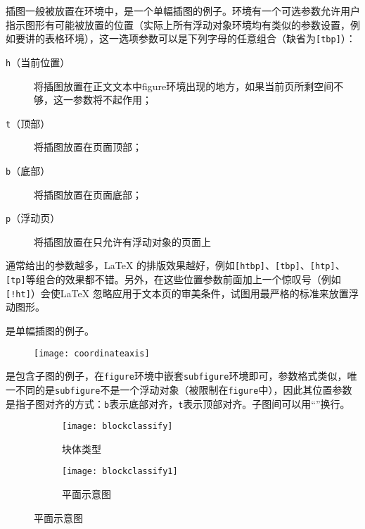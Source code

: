 插图一般被放置在环境中，是一个单幅插图的例子。环境有一个可选参数允许用户指示图形有可能被放置的位置（实际上所有浮动对象环境均有类似的参数设置，例如要讲的表格环境），这一选项参数可以是下列字母的任意组合（缺省为\texttt{[tbp]}）：
\begin{description}
	\item[\texttt{h}（当前位置）] 将插图放置在正文文本中figure环境出现的地方，如果当前页所剩空间不够，这一参数将不起作用；
	\item[\texttt{t}（顶部）] 将插图放置在页面顶部；
	\item[\texttt{b}（底部）] 将插图放置在页面底部；
	\item[\texttt{p}（浮动页）] 将插图放置在只允许有浮动对象的页面上
\end{description}

通常给出的参数越多，\LaTeX{} 的排版效果越好，例如\texttt{[htbp]}、\texttt{[tbp]}、\texttt{[htp]}、\texttt{[tp]}等组合的效果都不错。另外，在这些位置参数前面加上一个惊叹号（例如\texttt{[!ht]}）会使\LaTeX{} 忽略应用于文本页的审美条件，试图用最严格的标准来放置浮动图形。

是单幅插图的例子。

\begin{figure}[htbp]
\centering
\texttt{[image: coordinateaxis]}
\label{fig:samples:coordinateaxis}
\end{figure}

是包含子图的例子，在\texttt{figure}环境中嵌套\texttt{subfigure}环境即可，参数格式类似，唯一不同的是\texttt{subfigure}不是一个浮动对象（被限制在\texttt{figure}中），因此其位置参数是指子图对齐的方式：\texttt{b}表示底部对齐，\texttt{t}表示顶部对齐。子图间可以用“\ltxcmdname{\textbackslash}”换行。

\begin{figure}[htbp]
\def\figwidth{\columnwidth}
  \centering
    \begin{subfigure}[b]{0.58\figwidth} %
      \centering
      \texttt{[image: blockclassify]}
      \caption{块体类型}\label{fig:samples:blockclassify}
    \end{subfigure} %
    \begin{subfigure}[b]{0.4\figwidth}
      \centering
      \texttt{[image: blockclassify1]}
      \caption{平面示意图}\label{fig:samples:blockclassify1}
    \end{subfigure}
  \label{fig:samples:blcfy}
\end{figure}

